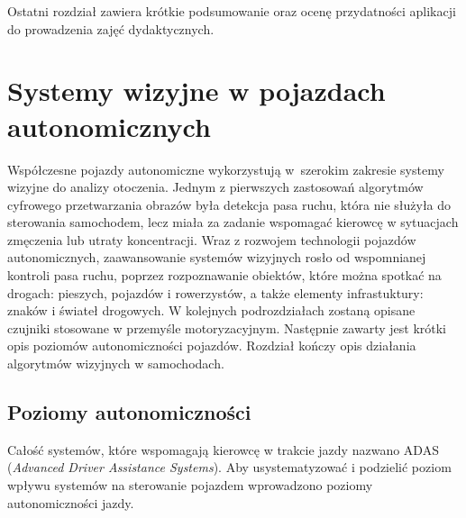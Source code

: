 Ostatni rozdział zawiera krótkie podsumowanie oraz ocenę przydatności aplikacji do prowadzenia zajęć dydaktycznych.

\chapter{Systemy wizyjne w pojazdach autonomicznych}

Współczesne pojazdy autonomiczne wykorzystują w~szerokim zakresie systemy wizyjne do analizy otoczenia. 
Jednym z pierwszych zastosowań algorytmów cyfrowego przetwarzania obrazów była detekcja pasa ruchu, która nie służyła do sterowania samochodem, lecz miała za zadanie wspomagać kierowcę w sytuacjach zmęczenia lub utraty koncentracji. 
Wraz z rozwojem technologii pojazdów autonomicznych, zaawansowanie systemów wizyjnych rosło od wspomnianej kontroli pasa ruchu, poprzez rozpoznawanie obiektów, które można spotkać na drogach: pieszych, pojazdów i rowerzystów, a także elementy infrastuktury: znaków i świateł drogowych.
W kolejnych podrozdziałach zostaną opisane czujniki stosowane w przemyśle motoryzacyjnym. Następnie zawarty jest krótki opis poziomów autonomiczności pojazdów. Rozdział kończy opis działania algorytmów wizyjnych w samochodach.


\section{Poziomy autonomiczności}

Całość systemów, które wspomagają kierowcę w trakcie jazdy nazwano ADAS (\textit{Advanced Driver Assistance Systems}). 
Aby usystematyzować i podzielić poziom wpływu systemów na sterowanie pojazdem wprowadzono poziomy autonomiczności jazdy.

